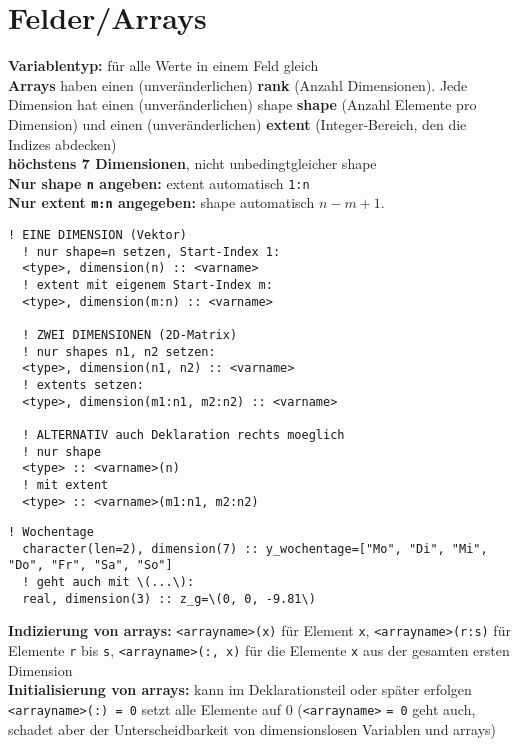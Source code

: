 \documentclass[a4paper, twocolumn]{scrarticle}
\begin{document}
\section{Felder/Arrays}
\textbf{Variablentyp:} für alle Werte in einem Feld  gleich\\
\textbf{Arrays} haben einen (unveränderlichen) \textbf{rank} (Anzahl Dimensionen). Jede Dimension hat einen (unveränderlichen) shape \textbf{shape} (Anzahl Elemente pro Dimension) und einen (unveränderlichen) \textbf{extent} (Integer-Bereich, den die Indizes abdecken)\\
\textbf{höchstens 7 Dimensionen}, nicht unbedingtgleicher shape\\
\textbf{Nur shape \lstinline|n| angeben:} extent automatisch \lstinline|1:n|\\
\textbf{Nur extent \lstinline|m:n| angegeben:} shape automatisch $n-m+1$.
\begin{lstlisting}[caption={\bfseries Deklarationsmöglichkeiten für arrays}]
  ! EINE DIMENSION (Vektor)
  ! nur shape=n setzen, Start-Index 1:
  <type>, dimension(n) :: <varname>
  ! extent mit eigenem Start-Index m:
  <type>, dimension(m:n) :: <varname>
  
  ! ZWEI DIMENSIONEN (2D-Matrix)
  ! nur shapes n1, n2 setzen:
  <type>, dimension(n1, n2) :: <varname>
  ! extents setzen:
  <type>, dimension(m1:n1, m2:n2) :: <varname>
  
  ! ALTERNATIV auch Deklaration rechts moeglich
  ! nur shape
  <type> :: <varname>(n)
  ! mit extent
  <type> :: <varname>(m1:n1, m2:n2)
\end{lstlisting}
\begin{lstlisting}[caption={\bfseries Beispiele direkte Definition arrays}]
  ! Wochentage
  character(len=2), dimension(7) :: y_wochentage=["Mo", "Di", "Mi", "Do", "Fr", "Sa", "So"]
  ! geht auch mit \(...\):
  real, dimension(3) :: z_g=\(0, 0, -9.81\)
\end{lstlisting}
\textbf{Indizierung von arrays:} \lstinline|<arrayname>(x)| für Element \lstinline|x|, \lstinline|<arrayname>(r:s)| für Elemente \lstinline|r| bis \lstinline|s|, \lstinline|<arrayname>(:, x)| für die Elemente \lstinline|x| aus der gesamten ersten Dimension\\
\textbf{Initialisierung von arrays:} kann im Deklarationsteil oder später erfolgen \lstinline|<arrayname>(:) = 0| setzt alle Elemente auf 0 (\lstinline|<arrayname>| \lstinline|= 0| geht auch, schadet aber der Unterscheidbarkeit von dimensionslosen Variablen und arrays)\\
\end{document}
